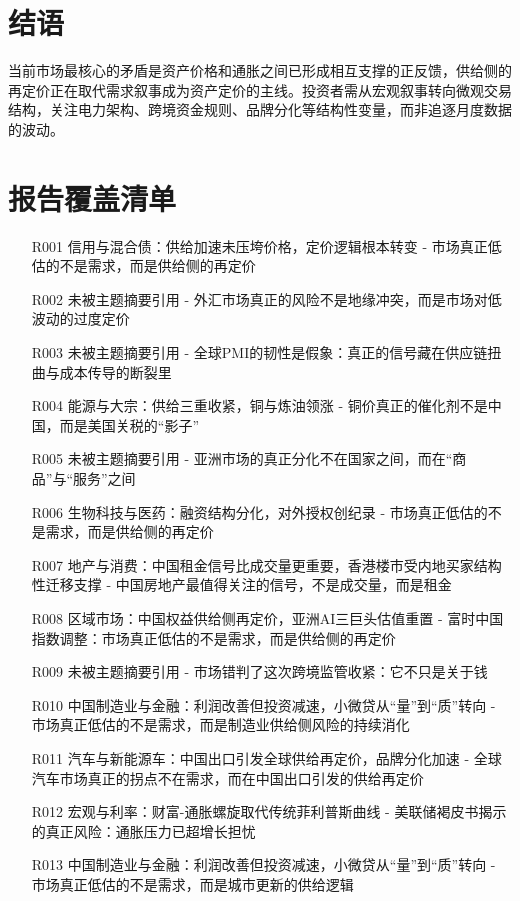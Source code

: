\documentclass[11pt]{ctexart}
\begin{document}
\section{结语}
当前市场最核心的矛盾是资产价格和通胀之间已形成相互支撑的正反馈，供给侧的再定价正在取代需求叙事成为资产定价的主线。投资者需从宏观叙事转向微观交易结构，关注电力架构、跨境资金规则、品牌分化等结构性变量，而非追逐月度数据的波动。
\newpage
\section{报告覆盖清单}
\begin{itemize}
  \item [R001] 信用与混合债：供给加速未压垮价格，定价逻辑根本转变 - 市场真正低估的不是需求，而是供给侧的再定价
  \item [R002] 未被主题摘要引用 - 外汇市场真正的风险不是地缘冲突，而是市场对低波动的过度定价
  \item [R003] 未被主题摘要引用 - 全球PMI的韧性是假象：真正的信号藏在供应链扭曲与成本传导的断裂里
  \item [R004] 能源与大宗：供给三重收紧，铜与炼油领涨 - 铜价真正的催化剂不是中国，而是美国关税的“影子”
  \item [R005] 未被主题摘要引用 - 亚洲市场的真正分化不在国家之间，而在“商品”与“服务”之间
  \item [R006] 生物科技与医药：融资结构分化，对外授权创纪录 - 市场真正低估的不是需求，而是供给侧的再定价
  \item [R007] 地产与消费：中国租金信号比成交量更重要，香港楼市受内地买家结构性迁移支撑 - 中国房地产最值得关注的信号，不是成交量，而是租金
  \item [R008] 区域市场：中国权益供给侧再定价，亚洲AI三巨头估值重置 - 富时中国指数调整：市场真正低估的不是需求，而是供给侧的再定价
  \item [R009] 未被主题摘要引用 - 市场错判了这次跨境监管收紧：它不只是关于钱
  \item [R010] 中国制造业与金融：利润改善但投资减速，小微贷从“量”到“质”转向 - 市场真正低估的不是需求，而是制造业供给侧风险的持续消化
  \item [R011] 汽车与新能源车：中国出口引发全球供给再定价，品牌分化加速 - 全球汽车市场真正的拐点不在需求，而在中国出口引发的供给再定价
  \item [R012] 宏观与利率：财富-通胀螺旋取代传统菲利普斯曲线 - 美联储褐皮书揭示的真正风险：通胀压力已超增长担忧
  \item [R013] 中国制造业与金融：利润改善但投资减速，小微贷从“量”到“质”转向 - 市场真正低估的不是需求，而是城市更新的供给逻辑

\end{itemize}
\end{document}
